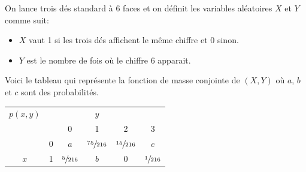 \begin{questions}
\question On lance trois dés standard à 6 faces et on définit les variables aléatoires $X$ et $Y$ comme suit:
\begin{itemize}
\item $X$ vaut 1 si les trois dés affichent le même chiffre et 0 sinon.
\item $Y$ est le nombre de fois où le chiffre 6 apparait.
\end{itemize}

Voici le tableau qui représente la fonction de masse conjointe de $(X, Y)$ où $a$, $b$ et $c$ sont des probabilités.

\begin{center}
\large{
\begin{tabular}{cc|cccc}
$p(x,y)$ & & & $y$& &\\
 & & 0 & 1 & 2 &3 \\ 
 \hline
 & 0 & $a$ & $\sfrac{75}{216}$  & $\sfrac{15}{216}$ & $c$\\
$x$ & 1 & $\sfrac{5}{216}$ & $b$ & $0$& $\sfrac{1}{216}$\\
\end{tabular}
}
 \end{center}

\end{questions}
